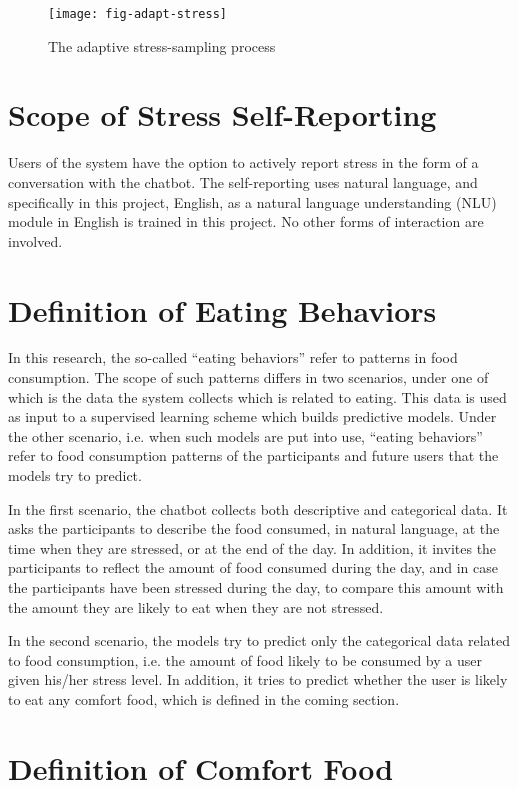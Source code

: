 \begin{figure}[ht]
  \centering
  \texttt{[image: fig-adapt-stress]}
	\caption{The adaptive stress-sampling process}
	\label{fig:adapt-stress}
\end{figure}

\section{Scope of Stress Self-Reporting}

Users of the system have the option to actively report stress in the form of a conversation with the chatbot. The self-reporting uses natural language, and specifically in this project, English, as a natural language understanding (NLU) module in English is trained in this project. No other forms of interaction are involved.

\section{Definition of Eating Behaviors}

In this research, the so-called “eating behaviors” refer to patterns in food consumption. The scope of such patterns differs in two scenarios, under one of which is the data the system collects which is related to eating. This data is used as input to a supervised learning scheme which builds predictive models. Under the other scenario, i.e. when such models are put into use, “eating behaviors” refer to food consumption patterns of the participants and future users that the models try to predict.

In the first scenario, the chatbot collects both descriptive and categorical data. It asks the participants to describe the food consumed, in natural language, at the time when they are stressed, or at the end of the day. In addition, it invites the participants to reflect the amount of food consumed during the day, and in case the participants have been stressed during the day, to compare this amount with the amount they are likely to eat when they are not stressed.

In the second scenario, the models try to predict only the categorical data related to food consumption, i.e. the amount of food likely to be consumed by a user given his/her stress level. In addition, it tries to predict whether the user is likely to eat any comfort food, which is defined in the coming section.

\section{Definition of Comfort Food}


